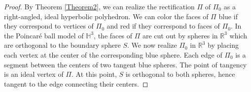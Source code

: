 \documentclass[10pt,a4paper]{amsart}
\newcommand{\R}{\mathbb{R}}
\begin{document}
\begin{proof}
By Theorem \ref{Theorem2}, we can realize the rectification $\Pi$ of $\Pi_0$ as a right-angled, ideal hyperbolic polyhedron. We can color the faces of $\Pi$ blue if they correspond to vertices of $\Pi_0$ and red if they correspond to faces of $\Pi_0$. In the Poincar\'{e} ball model of $\mathbb{H}^3$, the faces of $\Pi$ are cut out by spheres in $\R^3$ which are orthogonal to the boundary sphere $S$. We now realize $\Pi_0$ in $\R^3$ by placing each vertex at the center of the corresponding blue sphere. Each edge of $\Pi_0$ is a segment between the centers of two tangent blue spheres. The point of tangency is an ideal vertex of $\Pi$. At this point, $S$ is orthogonal to both spheres, hence tangent to the edge connecting their centers. 
\end{proof}
\end{document}
